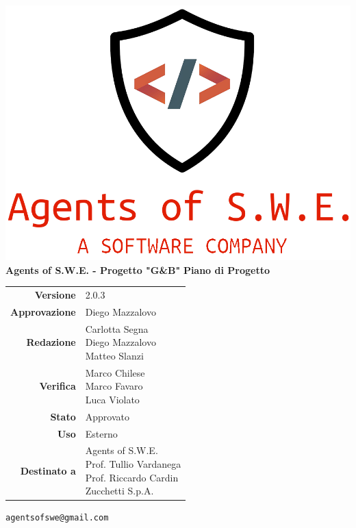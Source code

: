 


\usepackage{graphicx}

\renewcommand{\listtablename}{Indice delle Tabelle}
\renewcommand{\listfigurename}{Indice di Figure e Grafici}



\begin{titlepage}
\thispagestyle{empty}

\begin{center}
\includegraphics[scale=0.3]{./images/logo.png}\\
\large \textbf{Agents of S.W.E. - Progetto "G\&B"}
\vfill
\Huge \textbf{Piano di Progetto}
\vfill
\large
\renewcommand{\arraystretch}{1.3}
\begin{tabular}{r|l}


\textbf{Versione} & 2.0.3\\
\textbf{Approvazione} & Diego Mazzalovo\\
\textbf{Redazione} & \parbox[t]{5cm}{Carlotta Segna\\Diego Mazzalovo\\Matteo Slanzi}\\
\textbf{Verifica} & \parbox[t]{5cm}{Marco Chilese \\ Marco Favaro\\Luca Violato}\\
\textbf{Stato} & Approvato\\
\textbf{Uso} & Esterno\\
\textbf{Destinato a} & \parbox[t]{5cm}{Agents of S.W.E. \\Prof. Tullio Vardanega\\Prof. Riccardo Cardin \\ Zucchetti S.p.A.}
\end{tabular}
\vfill
\small
\texttt{agentsofswe@gmail.com}
\end{center}
\end{titlepage}


